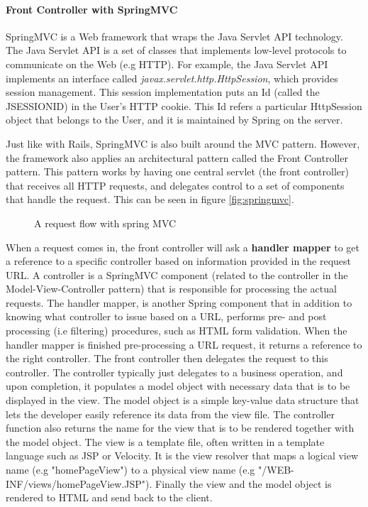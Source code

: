 \paragraph{Front Controller with SpringMVC}
SpringMVC is a Web framework that wraps the Java Servlet API technology. The Java Servlet API is a set of classes that implements low-level protocols to communicate on the Web (e.g HTTP). For example, the Java Servlet API implements an interface called \textit{javax.servlet.http.HttpSession}, which provides session management. This session implementation puts an Id (called the JSESSIONID) in the User's HTTP cookie. This Id refers a particular HttpSession object that belongs to the User, and it is maintained by Spring on the server. 

Just like with Rails, SpringMVC is also built around the MVC pattern. However, the framework also applies an architectural pattern called the Front Controller pattern\cite{frontcont}. This pattern works by having one central servlet (the front controller) that receives all HTTP requests, and delegates control to a set of components that handle the request. This can be seen in figure \vref{fig:springmvc}.
	\begin{figure}
	\begin{center}
	\end{center}
	\caption{A request flow with spring MVC}\label{fig:springmvc}
	\end{figure}
	
When a request comes in, the front controller will ask a \textbf{handler mapper} to get a reference to a specific controller based on information provided in the request URL. A controller is a SpringMVC component (related to the controller in the Model-View-Controller pattern) that is responsible for processing the actual requests. The handler mapper, is another Spring component that in addition to knowing what controller to issue based on a URL, performs pre- and post processing (i.e filtering) procedures, such as HTML form validation. When the handler mapper is finished pre-processing a URL request, it returns a reference to the right controller. The front controller then delegates the request to this controller. The controller typically just delegates to a business operation, and upon completion, it populates a model object with necessary data that is to be displayed in the view. The model object is a simple key-value data structure that lets the developer easily reference its data from the view file. The controller function also returns the name for the view that is to be rendered together with the model object. The view is a template file, often written in a template language such as JSP\cite{jsp} or Velocity\cite{velocity}. It is the view resolver that maps a logical view name (e.g "homePageView") to a physical view name (e.g "/WEB-INF/views/homePageView.JSP"). Finally the view and the model object is rendered to HTML and send back to the client. 
	
